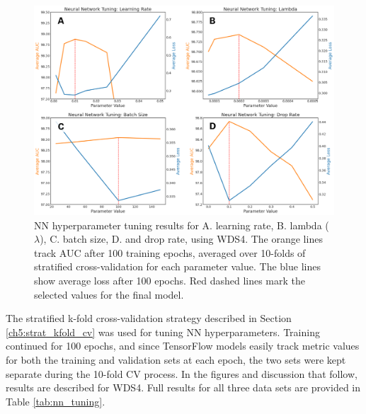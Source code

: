 \begin{figure}[htp]
\centering
\includegraphics[width=\textwidth]{templates/images/Figure-NN_Hyperparameters.png}
\caption[Neural network hyperparameter tuning]{NN hyperparameter tuning results for A. learning rate, B. lambda ($\lambda$), C. batch size, D. and drop rate, using WDS4. The orange lines track AUC after 100 training epochs, averaged over 10-folds of stratified cross-validation for each parameter value. The blue lines show average loss after 100 epochs. Red dashed lines mark the selected values for the final model.}
\label{fig:nn_tuning_plots}
\end{figure}

The stratified k-fold cross-validation strategy described in Section \ref{ch5:strat_kfold_cv} was used for tuning NN hyperparameters. Training continued for 100 epochs, and since TensorFlow models easily track metric values for both the training and validation sets at each epoch, the two sets were kept separate during the 10-fold CV process. In the figures and discussion that follow, results are described for WDS4. Full results for all three data sets are provided in Table \ref{tab:nn_tuning}. 

